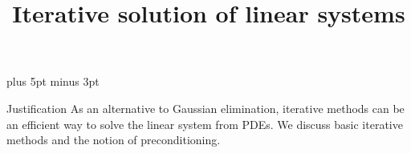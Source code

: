 \documentclass[11pt]{beamer}
\begin{document}
\parskip=10pt plus 5pt minus 3pt


\title{Iterative solution of linear systems}
\author{\hpcteachers}
\date{\hpcsemester}

\begin{frame}
  \titlepage
\end{frame}

\begin{frame}{Justification}
  As an alternative to Gaussian elimination, iterative methods can be
  an efficient way to solve the linear system from PDEs. We discuss
  basic iterative methods and the notion of preconditioning.
\end{frame}








\end{document}
